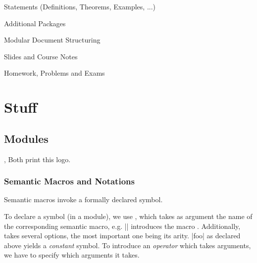 \begin{sfragment}{\sTeX Statements (Definitions, Theorems, Examples, ...)}
  

  
\end{sfragment}

\begin{sfragment}{Additional Packages}
  
  \begin{sfragment}{Modular Document Structuring}
    
  \end{sfragment}
  \begin{sfragment}{Slides and Course Notes}
    
  \end{sfragment}
  \begin{sfragment}{Homework, Problems and Exams}
    
    
    
  \end{sfragment}

\end{sfragment}

\chapter{Stuff}

\section{Modules}


\begin{function}{\sTeX , \stex}
  Both print this \stex logo.
\end{function}

 \subsection{Semantic Macros and Notations}

 Semantic macros invoke a formally declared symbol.

 To declare a symbol (in a module), we use ,
 which takes as argument the name of the corresponding
 semantic macro, e.g. || introduces the macro
 . Additionally,  takes several options,
 the most important one being its arity. |foo| as declared above
 yields a \emph{constant} symbol. To introduce an \emph{operator}
 which takes arguments, we have to specify which arguments it takes.

